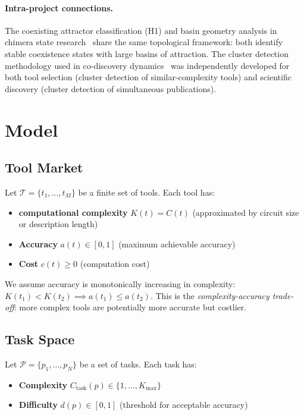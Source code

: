 \documentclass[12pt]{article}
\theoremstyle{definition}
\begin{document}
\paragraph{Intra-project connections.} The coexisting attractor classification (H1) and basin geometry analysis in chimera state research~\cite{chimera-stable-attractors-2026} share the same topological framework: both identify stable coexistence states with large basins of attraction. The cluster detection methodology used in co-discovery dynamics~\cite{S12-1-2026} was independently developed for both tool selection (cluster detection of similar-complexity tools) and scientific discovery (cluster detection of simultaneous publications).

\section{Model}

\subsection{Tool Market}

Let $\mathcal{T} = \{t_1, \ldots, t_M\}$ be a finite set of tools. Each tool has:
\begin{itemize}
  \item \textbf{computational complexity} $K(t) = C(t)$ (approximated by circuit size or description length)
  \item \textbf{Accuracy} $a(t) \in [0,1]$ (maximum achievable accuracy)
  \item \textbf{Cost} $c(t) \geq 0$ (computation cost)
\end{itemize}

We assume accuracy is monotonically increasing in complexity: $K(t_1) < K(t_2) \implies a(t_1) \leq a(t_2)$. This is the \emph{complexity-accuracy trade-off}: more complex tools are potentially more accurate but costlier.

\subsection{Task Space}

Let $\mathcal{P} = \{p_1, \ldots, p_N\}$ be a set of tasks. Each task has:
\begin{itemize}
  \item \textbf{Complexity} $C_{\mathrm{task}}(p) \in \{1, \ldots, K_{\max}\}$
  \item \textbf{Difficulty} $d(p) \in [0,1]$ (threshold for acceptable accuracy)
\end{itemize}
\end{document}
